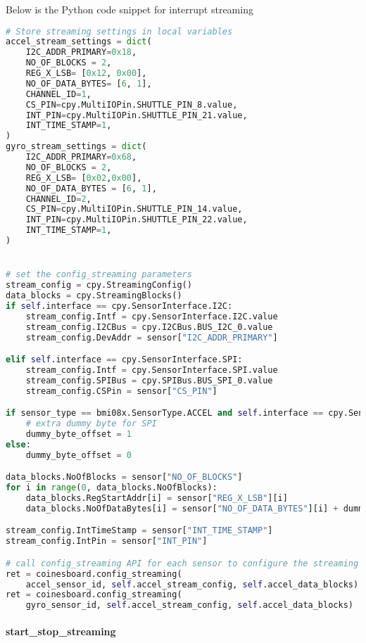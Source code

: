 \vspace{12pt}
Below is the Python code snippet for interrupt streaming
\begin{lstlisting}[language=Python]
# Store streaming settings in local variables
accel_stream_settings = dict(
	I2C_ADDR_PRIMARY=0x18,
	NO_OF_BLOCKS = 2,
	REG_X_LSB= [0x12, 0x00],
	NO_OF_DATA_BYTES= [6, 1],
	CHANNEL_ID=1,
	CS_PIN=cpy.MultiIOPin.SHUTTLE_PIN_8.value,
	INT_PIN=cpy.MultiIOPin.SHUTTLE_PIN_21.value,
	INT_TIME_STAMP=1,
)
gyro_stream_settings = dict(
	I2C_ADDR_PRIMARY=0x68,
	NO_OF_BLOCKS = 2,
	REG_X_LSB= [0x02,0x00],
	NO_OF_DATA_BYTES = [6, 1],
	CHANNEL_ID=2,
	CS_PIN=cpy.MultiIOPin.SHUTTLE_PIN_14.value,
	INT_PIN=cpy.MultiIOPin.SHUTTLE_PIN_22.value,
	INT_TIME_STAMP=1,
)


# set the config_streaming parameters
stream_config = cpy.StreamingConfig()
data_blocks = cpy.StreamingBlocks()
if self.interface == cpy.SensorInterface.I2C:
	stream_config.Intf = cpy.SensorInterface.I2C.value
	stream_config.I2CBus = cpy.I2CBus.BUS_I2C_0.value
	stream_config.DevAddr = sensor["I2C_ADDR_PRIMARY"]

elif self.interface == cpy.SensorInterface.SPI:
	stream_config.Intf = cpy.SensorInterface.SPI.value
	stream_config.SPIBus = cpy.SPIBus.BUS_SPI_0.value
	stream_config.CSPin = sensor["CS_PIN"]

if sensor_type == bmi08x.SensorType.ACCEL and self.interface == cpy.SensorInterface.SPI:
	# extra dummy byte for SPI
	dummy_byte_offset = 1
else:
	dummy_byte_offset = 0

data_blocks.NoOfBlocks = sensor["NO_OF_BLOCKS"]
for i in range(0, data_blocks.NoOfBlocks):
	data_blocks.RegStartAddr[i] = sensor["REG_X_LSB"][i]
	data_blocks.NoOfDataBytes[i] = sensor["NO_OF_DATA_BYTES"][i] + dummy_byte_offset

stream_config.IntTimeStamp = sensor["INT_TIME_STAMP"]
stream_config.IntPin = sensor["INT_PIN"]

# call config_streaming API for each sensor to configure the streaming settings
ret = coinesboard.config_streaming(
	accel_sensor_id, self.accel_stream_config, self.accel_data_blocks)
ret = coinesboard.config_streaming(
	gyro_sensor_id, self.accel_stream_config, self.accel_data_blocks)

\end{lstlisting}



\paragraph{start\_stop\_streaming}

